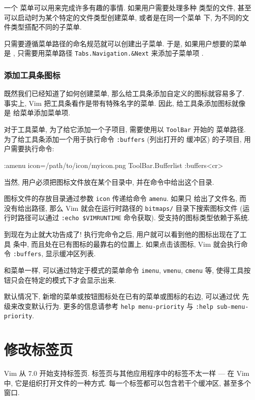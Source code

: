 一个  菜单可以用来完成许多有趣的事情. 如果用户需要处理多种
类型的文件, 甚至可以启动时为某个特定的文件类型创建菜单, 或者是在同一个菜单
下, 为不同的文件类型搭配不同的子菜单.

只需要遵循菜单路径的命名规范就可以创建出子菜单. 于是, 如果用户想要的菜单是
, 只需要用菜单路径
\texttt{Tabs.Navigation.\&Next} 来添加子菜单项 .

\subsubsection{添加工具条图标}
\label{subsubsec:adding_toolbar_icons}

既然我们已经知道了如何创建菜单, 那么给工具条添加自定义的图标就容易多了.
事实上, Vim 把工具条看作是带有特殊名字的菜单. 因此, 给工具条添加图标就像是
给菜单添加菜单项.

对于工具菜单, 为了给它添加一个子项目, 需要使用以 \texttt{ToolBar} 开始的
菜单路径. 为了给工具条添加一个用于执行命令 \texttt{:buffers} (列出打开的
缓冲区) 的子项目, 用户需要执行命令:
\begin{vimcmd}
:amenu icon=/path/to/icon/myicon.png ToolBar.Bufferlist :buffers<cr>
\end{vimcmd}
当然, 用户必须把图标文件放在某个目录中, 并在命令中给出这个目录.

图标文件的存放目录通过参数 \texttt{icon} 传递给命令 \texttt{amenu}. 如果只
给出了文件名, 而没有给出路径, 那么 Vim 就会在运行时路径的 \texttt{bitmaps/}
目录下搜索图标文件 (运行时路径可以通过 \texttt{:echo \$VIMRUNTIME}
命令获取). 受支持的图标类型依赖于系统.

到现在为止就大功告成了! 执行完命令之后, 用户就可以看到他的图标出现在了工具
条中, 而且处在已有图标的最靠右的位置上. 如果点击该图标, Vim 就会执行命令
\texttt{:buffers}, 显示缓冲区列表.

和菜单一样, 可以通过特定于模式的菜单命令 \texttt{imenu}, \texttt{vmenu},
\texttt{cmenu} 等, 使得工具按钮只会在特定的模式下才会显示出来.

\begin{warning}
默认情况下, 新增的菜单或按钮图标处在已有的菜单或图标的右边, 可以通过优
先级来改变默认行为. 更多的信息请参考 \texttt{help menu-priority} 与 
\texttt{:help sub-menu-priority}.
\end{warning}

\section{修改标签页}
\label{sec:modifying_tabs}
Vim 从 7.0 开始支持标签页. 标签页与其他应用程序中的标签不太一样 --- 在
Vim 中, 它是组织打开文件的一种方式. 每一个标签都可以包含若干个缓冲区,
甚至多个窗口.

